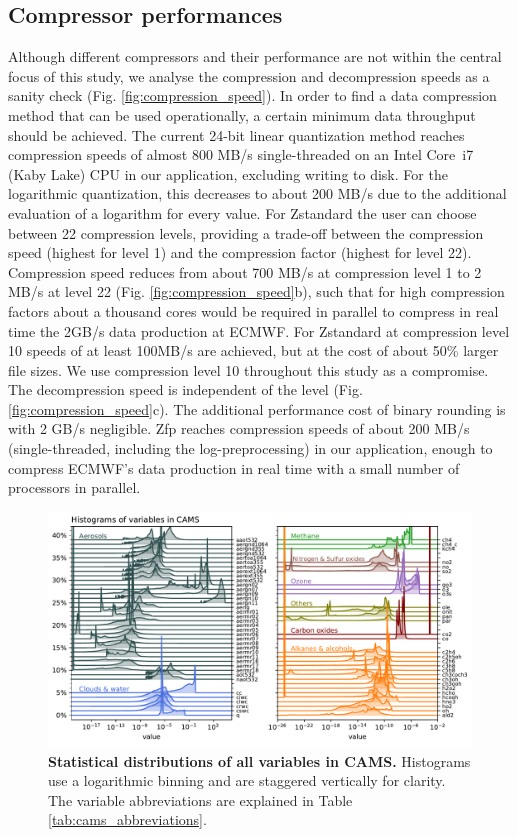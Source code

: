 \subsection{Compressor performances}

Although different compressors and their performance are not within the central focus of this study, we analyse
the compression and decompression speeds as a sanity check (Fig. \ref{fig:compression_speed}). In order to
find a data compression method that can be used operationally, a certain minimum data throughput should be achieved.
The current 24-bit linear quantization method reaches compression speeds of almost 800 MB/s single-threaded on an
Intel Core\texttrademark~i7 (Kaby Lake) CPU in our application, excluding writing to disk. For the logarithmic quantization,
this decreases to about 200 MB/s due to the additional evaluation of a logarithm for every value. For Zstandard the user
can choose between 22 compression levels, providing a trade-off between the compression speed (highest for level 1)
and the compression factor (highest for level 22). Compression speed reduces from about 700 MB/s at compression level 1
to 2 MB/s at level 22 (Fig. \ref{fig:compression_speed}b), such that for high compression factors about a thousand cores
would be required in parallel to compress in real time the 2GB/s data production at ECMWF. For Zstandard at compression
level 10 speeds of at least 100MB/s are achieved, but at the cost of about 50\% larger file sizes. We use compression level
10 throughout this study as a compromise. The decompression speed is independent of the level (Fig. \ref{fig:compression_speed}c).
The additional performance cost of binary rounding is with 2 GB/s negligible. Zfp reaches compression speeds of about 200 MB/s
(single-threaded, including the log-preprocessing) in our application, enough to compress ECMWF’s data production in real
time with a small number of processors in parallel.

\begin{figure}[tbhp]
	\includegraphics[width=1\textwidth]{Figures/compression/histograms.pdf}
	\caption{\textbf{Statistical distributions of all variables in CAMS.}
	Histograms use a logarithmic binning and are staggered vertically for clarity.
	The variable abbreviations are explained in Table \ref{tab:cams_abbreviations}.}
	\label{fig:cams_histograms}
\end{figure}

